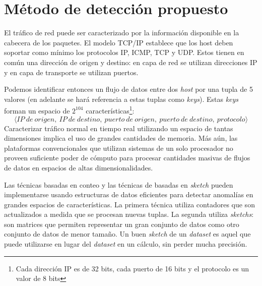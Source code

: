 \documentclass[a4paper,10pt, oneside]{article}
\begin{document}
\section{Método de detección propuesto}
El tráfico de red puede ser caracterizado por la información disponible en la cabecera de los paquetes. El modelo TCP/IP establece que los host deben soportar como mínimo los protocolos IP, ICMP, TCP y UDP\cite{rfc1122}. Estos tienen en común una dirección de origen y destino: en capa de red se utilizan direcciones IP\cite{rfc791} y en capa de transporte se utilizan puertos\cite{rfc768}\cite{rfc793}. \par

Podemos identificar entonces un flujo de datos entre dos \textit{host} por una tupla de 5 valores (en adelante se hará referencia a estas tuplas como \textit{keys}). Estas \textit{keys} forman un espacio de $2^{104}$ características\footnote{Cada dirección IP es de 32 bits, cada puerto de 16 bits y el protocolo es un valor de 8 bits}:
\[\langle IP\ de\ origen,\ IP\ de\ destino,\ puerto\ de\ origen,\ puerto\ de\ destino,\ protocolo \rangle\]
Caracterizar tráfico normal en tiempo real utilizando un espacio de tantas dimensiones implica el uso de grandes cantidades de memoria. Más aún, las plataformas convencionales que utilizan sistemas de un solo procesador no proveen suficiente poder de cómputo para procesar cantidades masivas de flujos de datos en espacios de altas dimensionalidades. \par
Las técnicas basadas en conteo y las técnicas de basadas en \textit{sketch}\cite{krishnamurthy2003sketch}\cite{muthukrishnan2005data} pueden implementarse usando estructuras de datos eficientes para detectar anomalías en grandes espacios de características\cite{huang2014ld}. La primera técnica utiliza contadores que son actualizados a medida que se procesan nuevas tuplas. La segunda utiliza \textit{sketchs}: son matrices que permiten representar un gran conjunto de datos como otro conjunto de datos de menor tamaño. Un buen \textit{sketch} de un \textit{dataset} es aquel que puede utilizarse en lugar del \textit{dataset} en un cálculo, sin perder mucha precisión\cite{liberty2013simple}.
\par
\end{document}
